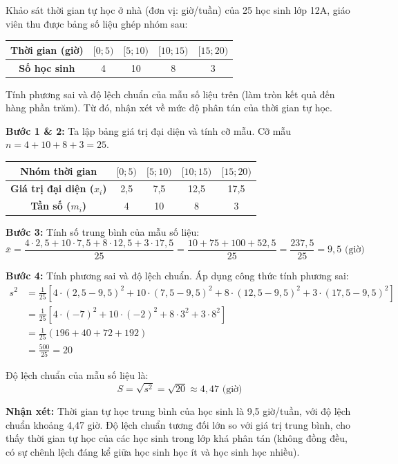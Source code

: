 \documentclass[12pt]{article}
\begin{document}
	\begin{vidu}[3]
		Khảo sát thời gian tự học ở nhà (đơn vị: giờ/tuần) của 25 học sinh lớp 12A, giáo viên thu được bảng số liệu ghép nhóm sau:
		\begin{center}
			\renewcommand{\arraystretch}{1.3}
			\begin{tabular}{|c|c|c|c|c|}
				\hline
				\textbf{Thời gian (giờ)} & $[0; 5)$ & $[5; 10)$ & $[10; 15)$ & $[15; 20)$ \\
				\hline
				\textbf{Số học sinh} & 4 & 10 & 8 & 3 \\
				\hline
			\end{tabular}
		\end{center}
		Tính phương sai và độ lệch chuẩn của mẫu số liệu trên (làm tròn kết quả đến hàng phần trăm). Từ đó, nhận xét về mức độ phân tán của thời gian tự học.
	\end{vidu}
	
	\begin{loigiai}
		\textbf{Bước 1 \& 2:} Ta lập bảng giá trị đại diện và tính cỡ mẫu.
		Cỡ mẫu $n = 4 + 10 + 8 + 3 = 25$.
		\begin{center}
			\renewcommand{\arraystretch}{1.3}
			\begin{tabular}{|c|c|c|c|c|}
				\hline
				\textbf{Nhóm thời gian} & $[0; 5)$ & $[5; 10)$ & $[10; 15)$ & $[15; 20)$ \\
				\hline
				\textbf{Giá trị đại diện ($x_i$)} & 2,5 & 7,5 & 12,5 & 17,5 \\
				\hline
				\textbf{Tần số ($m_i$)} & 4 & 10 & 8 & 3 \\
				\hline
			\end{tabular}
		\end{center}
		
		\textbf{Bước 3:} Tính số trung bình của mẫu số liệu:
		\[ \bar{x} = \frac{4 \cdot 2,5 + 10 \cdot 7,5 + 8 \cdot 12,5 + 3 \cdot 17,5}{25} = \frac{10 + 75 + 100 + 52,5}{25} = \frac{237,5}{25} = 9,5 \text{ (giờ)} \]
		
		\textbf{Bước 4:} Tính phương sai và độ lệch chuẩn.
		Áp dụng công thức tính phương sai:
		\begin{align*}
			s^2 &= \frac{1}{25} \left[ 4 \cdot (2,5 - 9,5)^2 + 10 \cdot (7,5 - 9,5)^2 + 8 \cdot (12,5 - 9,5)^2 + 3 \cdot (17,5 - 9,5)^2 \right] \\
			&= \frac{1}{25} \left[ 4 \cdot (-7)^2 + 10 \cdot (-2)^2 + 8 \cdot 3^2 + 3 \cdot 8^2 \right] \\
			&= \frac{1}{25} \left( 196 + 40 + 72 + 192 \right) \\
			&= \frac{500}{25} = 20
		\end{align*}
		
		Độ lệch chuẩn của mẫu số liệu là:
		\[ S = \sqrt{s^2} = \sqrt{20} \approx 4,47 \text{ (giờ)} \]
		
		\textbf{Nhận xét:} Thời gian tự học trung bình của học sinh là 9,5 giờ/tuần, với độ lệch chuẩn khoảng 4,47 giờ. Độ lệch chuẩn tương đối lớn so với giá trị trung bình, cho thấy thời gian tự học của các học sinh trong lớp khá phân tán (không đồng đều, có sự chênh lệch đáng kể giữa học sinh học ít và học sinh học nhiều).
	\end{loigiai}
	
\end{document}
